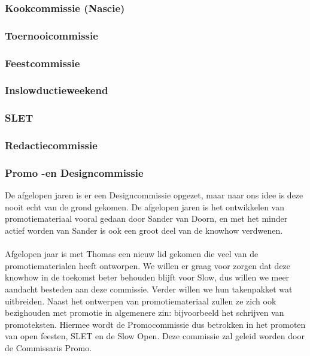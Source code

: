 \documentclass[]{article}
\begin{document}
\subsubsection{Kookcommissie (Nascie)}

\subsubsection{Toernooicommissie}

\subsubsection{Feestcommissie}

\subsubsection{Inslowductieweekend}

\subsubsection{SLET}

\subsubsection{Redactiecommissie}

\subsubsection{Promo -en Designcommissie}
De afgelopen jaren is er een Designcommissie opgezet, maar naar ons idee is deze nooit echt van de grond gekomen. De afgelopen jaren is het ontwikkelen van promotiemateriaal vooral gedaan door Sander van Doorn, en met het minder actief worden van Sander is ook een groot deel van de knowhow verdwenen.\\\\
Afgelopen jaar is met Thomas een nieuw lid gekomen die veel van de promotiematerialen heeft ontworpen. We willen er graag voor zorgen dat deze knowhow in de toekomst beter behouden blijft voor Slow, dus willen we meer aandacht besteden aan deze commissie. Verder willen we hun takenpakket wat uitbreiden. Naast het ontwerpen van promotiemateriaal zullen ze zich ook bezighouden met promotie in algemenere zin: bijvoorbeeld het schrijven van promoteksten. Hiermee wordt de Promocommissie dus betrokken in het promoten van open feesten, SLET en de Slow Open. Deze commissie zal geleid worden door de Commissaris Promo.
\end{document}
